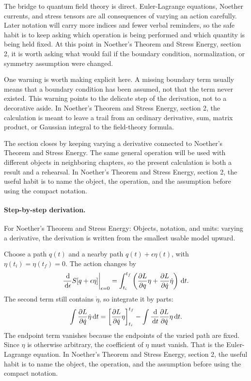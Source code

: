 The bridge to quantum field theory is direct.  Euler-Lagrange equations, Noether currents, and stress tensors are all consequences of varying an action carefully.  Later notation will carry more indices and fewer verbal reminders, so the safe habit is to keep asking which operation is being performed and which quantity is being held fixed.  At this point in Noether's Theorem and Stress Energy, section 2, it is worth asking what would fail if the boundary condition, normalization, or symmetry assumption were changed.

One warning is worth making explicit here.  A missing boundary term usually means that a boundary condition has been assumed, not that the term never existed.  This warning points to the delicate step of the derivation, not to a decorative aside.  In Noether's Theorem and Stress Energy, section 2, the calculation is meant to leave a trail from an ordinary derivative, sum, matrix product, or Gaussian integral to the field-theory formula.

The section closes by keeping varying a derivative connected to Noether's Theorem and Stress Energy.  The same general operation will be used with different objects in neighboring chapters, so the present calculation is both a result and a rehearsal.  In Noether's Theorem and Stress Energy, section 2, the useful habit is to name the object, the operation, and the assumption before using the compact notation.



\paragraph{Step-by-step derivation.}

For Noether's Theorem and Stress Energy: Objects, notation, and units: varying a derivative, the derivation is written from the smallest usable model upward.

Choose a path \(q(t)\) and a nearby path \(q(t)+\epsilon\eta(t)\), with \(\eta(t_i)=\eta(t_f)=0\).  The action changes by
\[
  \frac{\,\mathrm d}{\,\mathrm d\epsilon}S[q+\epsilon\eta]\bigg|_{\epsilon=0}
  =
  \int_{t_i}^{t_f}
  \left(
  \frac{\partial L}{\partial q}\eta+\frac{\partial L}{\partial\dot q}\dot\eta
  \right)\,\mathrm d t.
\]
The second term still contains \(\dot\eta\), so integrate it by parts:
\[
  \int \frac{\partial L}{\partial\dot q}\dot\eta\,\mathrm d t
  =
  \left[\frac{\partial L}{\partial\dot q}\eta\right]_{t_i}^{t_f}
  -
  \int \frac{\,\mathrm d}{\,\mathrm d t}\frac{\partial L}{\partial\dot q}\eta\,\mathrm d t.
\]
The endpoint term vanishes because the endpoints of the varied path are fixed.  Since \(\eta\) is otherwise arbitrary, the coefficient of \(\eta\) must vanish.  That is the Euler-Lagrange equation.  In Noether's Theorem and Stress Energy, section 2, the useful habit is to name the object, the operation, and the assumption before using the compact notation.

